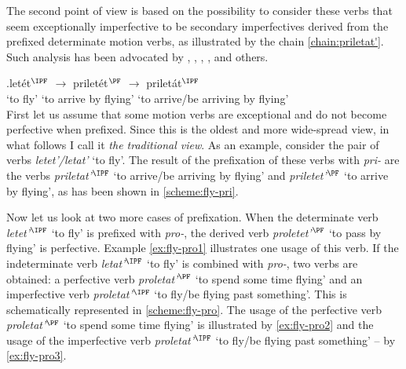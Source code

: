 The second point of view is based on the possibility to consider these verbs that seem exceptionally imperfective to be secondary imperfectives derived from the prefixed determinate motion verbs, as illustrated by the chain \ref{chain:priletat'}. Such analysis has been advocated by \citet{Regnell:44}, \citet[337-344]{Isachenko:60}, \citet[87-95]{ZaliznjakShmelev:00}, \citet{Romanova:06}, and others.

\exg.\label{chain:priletat'}{let\'{e}t$^{\IPF}$} {$\to$} {prilet\'{e}t$^{\PF}$} {$\to$} prilet\'{a}t$^{\IPF}$\\
{`to fly'} {} {`to arrive by flying'} {} {`to arrive/be arriving by flying'}\\


First let us assume that some motion verbs are exceptional and do not become perfective when prefixed. Since this is the oldest and more wide-spread view, in what follows I call it \textit{the traditional view}. As an example, consider the pair of verbs \textit{letet'/letat'} `to fly'. The result of the prefixation of these verbs with \textit{pri-} are the verbs \textit{priletat'}$^{\IPF}$ `to arrive/be arriving by flying' and \textit{priletet'$^{\PF}$} `to arrive by flying', as has been shown in \ref{scheme:fly-pri}. 


Now let us look at two more cases of prefixation. When the determinate verb \textit{letet'}$^{\IPF}$ `to fly' is prefixed with \textit{pro-}, the derived verb \textit{proletet'}$^{\PF}$ `to pass by flying' is perfective. Example \ref{ex:fly-pro1} illustrates one usage of this verb. If the indeterminate verb \textit{letat'}$^{\IPF}$ `to fly' is combined with \textit{pro-}, two verbs are obtained: a perfective verb \textit{proletat'}$^{\PF}$ `to spend some time flying' and an imperfective verb \textit{proletat'}$^{\IPF}$ `to fly/be flying past something'.  This is schematically represented in \ref{scheme:fly-pro}. The usage of the perfective verb \textit{proletat'}$^{\PF}$ `to spend some time flying' is illustrated by \ref{ex:fly-pro2} and the usage of the imperfective verb \textit{proletat'}$^{\IPF}$ `to fly/be flying past something' -- by \ref{ex:fly-pro3}. 

